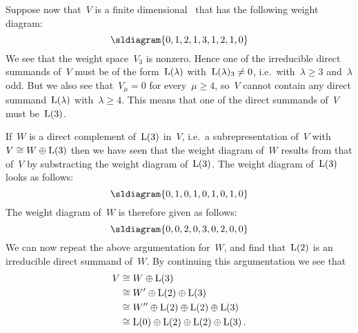 \begin{fluff}
  Suppose now that~$V$ is a finite dimensional~{} that has the following weight diagram:
  \[
    \sldiagram{0,1,2,1,3,1,2,1,0}
  \]
  We see that the weight space~$V_3$ is nonzero.
  Hence one of the irreducible direct summands of~$V$ must be of the form~$\operatorname{L}(\lambda)$ with~$\operatorname{L}(\lambda)_3 \neq 0$, i.e.\ with~$\lambda \geq 3$ and~$\lambda$ odd.
  But we also see that~$V_\mu = 0$ for every~$\mu \geq 4$, so~$V$ cannot contain any direct summand~$\operatorname{L}(\lambda)$ with~$\lambda \geq 4$.
  This means that one of the direct summands of~$V$ must be~$\operatorname{L}(3)$.
  
  If~$W$ is a direct complement of~$\operatorname{L}(3)$ in~$V$, i.e.\ a subrepresentation of~$V$ with~$V \cong W \oplus \operatorname{L}(3)$ then we have seen that the weight diagram of~$W$ results from that of~$V$ by substracting the weight diagram of~$\operatorname{L}(3)$.
  The weight diagram of~$\operatorname{L}(3)$ looks as follows:
  \[
    \sldiagram{0,1,0,1,0,1,0,1,0}
  \]
  The weight diagram of~$W$ is therefore given as follows:
  \[
    \sldiagram{0,0,2,0,3,0,2,0,0}
  \]
  We can now repeat the above argumentation for~$W$, and find that~$\operatorname{L}(2)$ is an irreducible direct summand of~$W$.
  By continuing this argumentation we see that
  \begin{align*}
    V
    &\cong
    W \oplus \operatorname{L}(3)
    \\
    &\cong
    W' \oplus \operatorname{L}(2) \oplus \operatorname{L}(3)
    \\
    &\cong
    W'' \oplus \operatorname{L}(2) \oplus \operatorname{L}(2) \oplus \operatorname{L}(3)
    \\
    &\cong
    \operatorname{L}(0) \oplus \operatorname{L}(2) \oplus \operatorname{L}(2) \oplus \operatorname{L}(3) \,.
  \end{align*}
\end{fluff}


